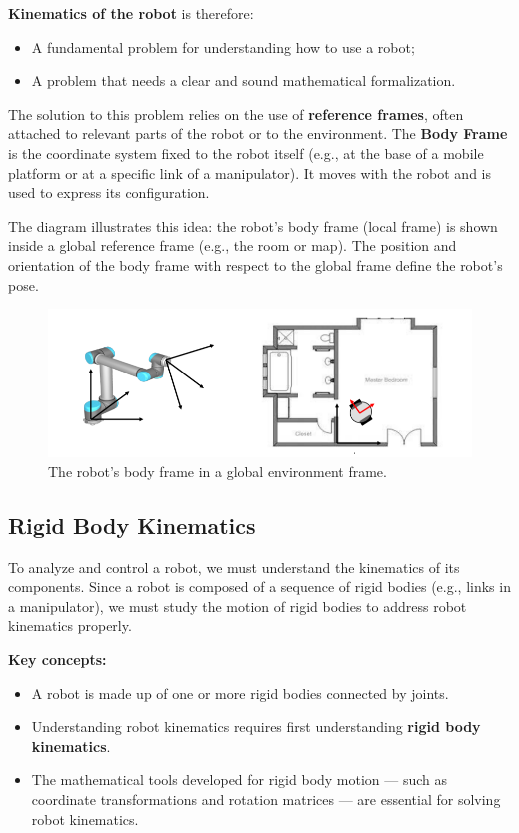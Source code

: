 \textbf{Kinematics of the robot} is therefore:
\begin{itemize}
  \item A fundamental problem for understanding how to use a robot;
  \item A problem that needs a clear and sound mathematical formalization.
\end{itemize}

The solution to this problem relies on the use of \textbf{reference frames}, often attached to relevant parts of the robot or to the environment. The \textbf{Body Frame} is the coordinate system fixed to the robot itself (e.g., at the base of a mobile platform or at a specific link of a manipulator). It moves with the robot and is used to express its configuration.

The diagram illustrates this idea: the robot's body frame (local frame) is shown inside a global reference frame (e.g., the room or map). The position and orientation of the body frame with respect to the global frame define the robot's pose.

\begin{figure}[H]
  \centering
  \includegraphics[width=\linewidth]{imgs/part_of_interest_kinematics.png}
  \caption{The robot’s body frame in a global environment frame.}
\end{figure}

\hfill

\subsection{Rigid Body Kinematics}

To analyze and control a robot, we must understand the kinematics of its components. Since a robot is composed of a sequence of rigid bodies (e.g., links in a manipulator), we must study the motion of rigid bodies to address robot kinematics properly.

\textbf{Key concepts:}
\begin{itemize}
  \item A robot is made up of one or more rigid bodies connected by joints.
  \item Understanding robot kinematics requires first understanding \textbf{rigid body kinematics}.
  \item The mathematical tools developed for rigid body motion — such as coordinate transformations and rotation matrices — are essential for solving robot kinematics.
\end{itemize}

